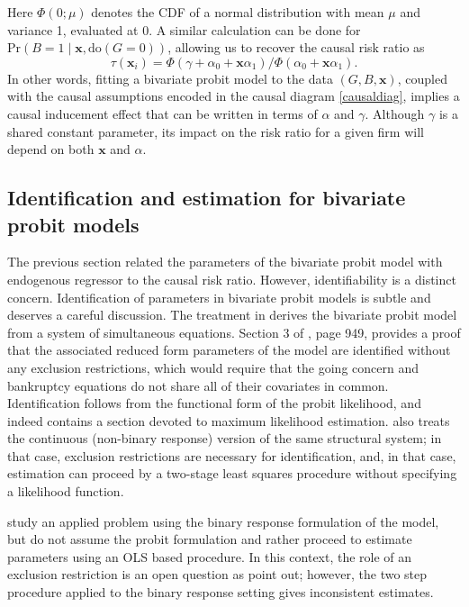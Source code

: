 \documentclass[aoas,preprint, 11pt, dvipsnames, table, x11name]{imsart}
\theoremstyle{remark}
\begin{document}
	Here $\Phi(0; \mu)$ denotes the CDF of a normal distribution with mean $\mu$ and variance 1, evaluated at 0.  A similar calculation can be done for $\mbox{Pr}(B = 1 \mid \mathbf{x}, \text{do}(G = 0))$, allowing us to recover the causal risk ratio as $$\tau(\mathbf{x}_i) = \Phi(\gamma + \alpha_0 + \mathbf{x}\alpha_1) /\Phi(\alpha_0 + \mathbf{x}\alpha_1).$$  In other words, fitting a bivariate probit model to the data $(G, B, \mathbf{x})$, coupled with the causal assumptions encoded in the causal diagram \autoref{causaldiag}, implies a causal inducement effect that can be written in terms of $\alpha$ and $\gamma$. Although $\gamma$ is a shared constant parameter, its impact on the risk ratio for a given firm will depend on both $\mathbf{x}$ and $\alpha$. 
	
	\subsection{Identification and estimation for bivariate probit models}\label{techremarks}
	
	The previous section related the parameters of the bivariate probit model with endogenous regressor to the causal risk ratio. However, identifiability is a distinct concern. Identification of parameters in bivariate probit models is subtle and deserves a careful discussion. The treatment in \cite{Heckman-1978} derives the bivariate probit model from a system of simultaneous equations.  Section 3 of \cite{Heckman-1978}, page 949, provides a proof that the associated reduced form parameters of the model are identified without any exclusion restrictions, which would require that the going concern and bankruptcy equations do not share all of their covariates in common.  Identification follows from the functional form of the probit likelihood, and indeed \cite{Heckman-1978} contains a section devoted to maximum likelihood estimation.  \cite{Heckman-1978} also treats the continuous (non-binary response) version of the same structural system; in that case, exclusion restrictions are necessary for identification, and, in that case, estimation can proceed by a two-stage least squares procedure without specifying a likelihood function.  
	
	\cite{Evans-Schwab-1995} study an applied problem using the binary response formulation of the \cite{Heckman-1978} model, but do not assume the probit formulation and rather proceed to estimate parameters using an OLS based procedure.  In this context, the role of an exclusion restriction is an open question as  \cite{Altonji-Elder-Taber-2005} point out; however, the two step procedure applied to the binary response setting gives inconsistent estimates. 
	
\end{document}
